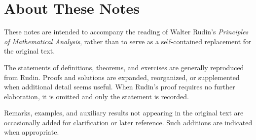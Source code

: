 \documentclass[11pt]{article}
\begin{document}

\maketitle
\thispagestyle{empty}

\clearpage

\vspace{1em}

\section*{About These Notes}

These notes are intended to accompany the reading of Walter Rudin's
\emph{Principles of Mathematical Analysis}, rather than to serve as a
self-contained replacement for the original text.

The statements of definitions, theorems, and exercises are generally
reproduced from Rudin. Proofs and solutions are expanded, reorganized,
or supplemented when additional detail seems useful. When Rudin's proof
requires no further elaboration, it is omitted and only the statement is
recorded.

Remarks, examples, and auxiliary results not appearing in the original
text are occasionally added for clarification or later reference.
Such additions are indicated when appropriate.

\clearpage

\tableofcontents

\clearpage






\end{document}
